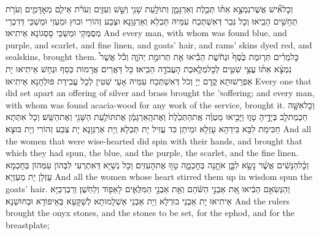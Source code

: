 {וְכׇל\maqqaf אִ֞ישׁ אֲשֶׁר\maqqaf נִמְצָ֣א אִתּ֗וֹ תְּכֵ֧לֶת וְאַרְגָּמָ֛ן וְתוֹלַ֥עַת שָׁנִ֖י וְשֵׁ֣שׁ וְעִזִּ֑ים וְעֹרֹ֨ת אֵילִ֧ם מְאׇדָּמִ֛ים וְעֹרֹ֥ת תְּחָשִׁ֖ים הֵבִֽיאוּ׃}
{וְכָל גְּבַר דְּאִשְׁתְּכַח עִמֵּיהּ תַּכְלָא וְאַרְגְּוָנָא וּצְבַע זְהוֹרִי וּבוּץ וּמַעְזֵי וּמַשְׁכֵּי דְּדִכְרֵי מְסֻמְּקֵי וּמַשְׁכֵּי סָסְגוֹנָא אֵיתִיאוּ׃}
{And every man, with whom was found blue, and purple, and scarlet, and fine linen, and goats’ hair, and rams’ skins dyed red, and sealskins, brought them.}{}
{כׇּל\maqqaf מֵרִ֗ים תְּר֤וּמַת כֶּ֙סֶף֙ וּנְחֹ֔שֶׁת הֵבִ֕יאוּ אֵ֖ת תְּרוּמַ֣ת יְהֹוָ֑ה וְכֹ֡ל אֲשֶׁר֩ נִמְצָ֨א אִתּ֜וֹ עֲצֵ֥י שִׁטִּ֛ים לְכׇל\maqqaf מְלֶ֥אכֶת הָעֲבֹדָ֖ה הֵבִֽיאוּ׃}
{כָּל דַּאֲרֵים אֲרָמוּת כְּסַף וּנְחָשׁ אֵיתִיאוּ יָת אַפְרָשׁוּתָא קֳדָם יְיָ וְכֹל דְּאִשְׁתְּכַח עִמֵּיהּ אָעֵי שִׁטִּין לְכָל עֲבִידַת פּוּלְחָנָא אֵיתִיאוּ׃}
{Every one that did set apart an offering of silver and brass brought the \lord\textsc{’s}\space offering; and every man, with whom was found acacia-wood for any work of the service, brought it.}{}
{וְכׇל\maqqaf אִשָּׁ֥ה חַכְמַת\maqqaf לֵ֖ב בְּיָדֶ֣יהָ טָו֑וּ וַיָּבִ֣יאוּ מַטְוֶ֗ה אֶֽת\maqqaf הַתְּכֵ֙לֶת֙ וְאֶת\maqqaf הָֽאַרְגָּמָ֔ן אֶת\maqqaf תּוֹלַ֥עַת הַשָּׁנִ֖י וְאֶת\maqqaf הַשֵּֽׁשׁ׃}
{וְכָל אִתְּתָא חַכִּימַת לִבָּא בִּידַהָא עָזְלָא וּמֵיתַן כִּד עֲזִיל יָת תַּכְלָא וְיָת אַרְגְּוָנָא יָת צְבַע זְהוֹרִי וְיָת בּוּצָא׃}
{And all the women that were wise-hearted did spin with their hands, and brought that which they had spun, the blue, and the purple, the scarlet, and the fine linen.}{}
{וְכׇ֨ל\maqqaf הַנָּשִׁ֔ים אֲשֶׁ֨ר נָשָׂ֥א לִבָּ֛ן אֹתָ֖נָה בְּחׇכְמָ֑ה טָו֖וּ אֶת\maqqaf הָעִזִּֽים׃}
{וְכָל נְשַׁיָּא דְּאִתְרְעִי לִבְּהוֹן עִמְּהוֹן בְּחָכְמָא עָזְלָן יָת מַעַזְיָא׃}
{And all the women whose heart stirred them up in wisdom spun the goats’ hair.}{}
{וְהַנְּשִׂאִ֣ם הֵבִ֔יאוּ אֵ֚ת אַבְנֵ֣י הַשֹּׁ֔הַם וְאֵ֖ת אַבְנֵ֣י הַמִּלֻּאִ֑ים לָאֵפ֖וֹד וְלַחֹֽשֶׁן׃}
{וְרַבְרְבַיָּא אֵיתִיאוּ יָת אַבְנֵי בוּרְלָא וְיָת אַבְנֵי אַשְׁלָמוּתָא לְשַׁקָּעָא בְּאֵיפוֹדָא וּבְחוּשְׁנָא׃}
{And the rulers brought the onyx stones, and the stones to be set, for the ephod, and for the breastplate;}{}
